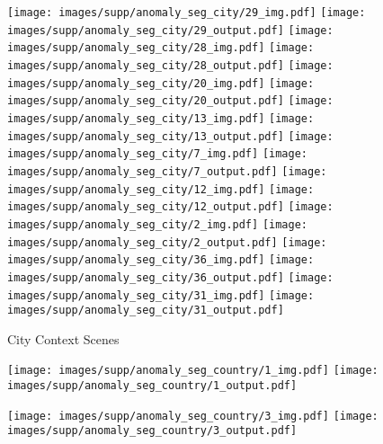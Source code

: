 \documentclass[10pt,twocolumn,letterpaper]{article}
\begin{document}
\begin{figure*}

\begin{subfigure}[b]{0.49\linewidth}
    \centering
    \texttt{[image: images/supp/anomaly\_seg\_city/29\_img.pdf]} \hfill
    \texttt{[image: images/supp/anomaly\_seg\_city/29\_output.pdf]}
    \texttt{[image: images/supp/anomaly\_seg\_city/28\_img.pdf]} \hfill
    \texttt{[image: images/supp/anomaly\_seg\_city/28\_output.pdf]}
    \texttt{[image: images/supp/anomaly\_seg\_city/20\_img.pdf]} \hfill
    \texttt{[image: images/supp/anomaly\_seg\_city/20\_output.pdf]}
    \texttt{[image: images/supp/anomaly\_seg\_city/13\_img.pdf]} \hfill
    \texttt{[image: images/supp/anomaly\_seg\_city/13\_output.pdf]}
    \texttt{[image: images/supp/anomaly\_seg\_city/7\_img.pdf]} \hfill
    \texttt{[image: images/supp/anomaly\_seg\_city/7\_output.pdf]}
    \texttt{[image: images/supp/anomaly\_seg\_city/12\_img.pdf]} \hfill
    \texttt{[image: images/supp/anomaly\_seg\_city/12\_output.pdf]}
    \texttt{[image: images/supp/anomaly\_seg\_city/2\_img.pdf]} \hfill
    \texttt{[image: images/supp/anomaly\_seg\_city/2\_output.pdf]}
    \texttt{[image: images/supp/anomaly\_seg\_city/36\_img.pdf]} \hfill
    \texttt{[image: images/supp/anomaly\_seg\_city/36\_output.pdf]}
    \texttt{[image: images/supp/anomaly\_seg\_city/31\_img.pdf]} \hfill
    \texttt{[image: images/supp/anomaly\_seg\_city/31\_output.pdf]}
    \caption{City Context Scenes}
    \label{fig:my_label}
\end{subfigure}
\begin{subfigure}[b]{0.49\linewidth}
    \centering
    \texttt{[image: images/supp/anomaly\_seg\_country/1\_img.pdf]} \hfill
    \texttt{[image: images/supp/anomaly\_seg\_country/1\_output.pdf]}
    
    \texttt{[image: images/supp/anomaly\_seg\_country/3\_img.pdf]} \hfill
    \texttt{[image: images/supp/anomaly\_seg\_country/3\_output.pdf]}
    

\end{subfigure}
\end{figure*}
\end{document}
